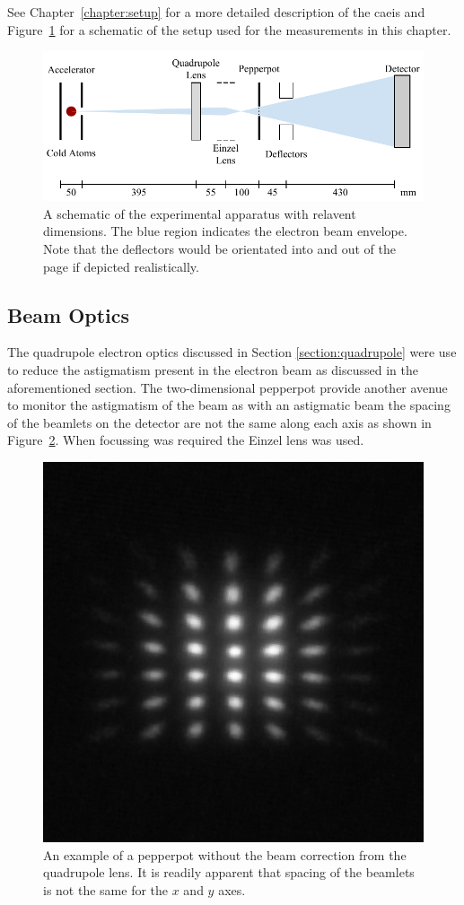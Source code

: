 See Chapter~\ref{chapter:setup} for a more detailed description of the \gls{caeis} and Figure~\ref{figure:emittance_schematic} for a schematic of the setup used for the measurements in this chapter.

\begin{figure}
\center
\includegraphics{part2/Figs/EmittanceApparatusSchematic.pdf}
\caption{A schematic of the experimental apparatus with relavent dimensions. The blue region indicates the electron beam envelope. Note that the deflectors would be orientated into and out of the page if depicted realistically.}
\label{figure:emittance_schematic}
\end{figure}

\subsection{Beam Optics}
The quadrupole electron optics discussed in Section \ref{section:quadrupole} were use to reduce the astigmatism present in the electron beam as discussed in the aforementioned section.
The two-dimensional pepperpot provide another avenue to monitor the astigmatism of the beam as with an astigmatic beam the spacing of the beamlets on the detector are not the same along each axis as shown in Figure~\ref{figure:astigmatic_pepperpot}.
When focussing was required the Einzel lens was used.

\begin{figure}
    \center
    \includegraphics[width=0.5\linewidth]{part2/Figs/example_astigmatic_pepperpot.jpeg}
    \caption{An example of a pepperpot without the beam correction from the quadrupole lens. It is readily apparent that spacing of the beamlets is not the same for the $x$ and $y$ axes.}
    \label{figure:astigmatic_pepperpot}
\end{figure}

